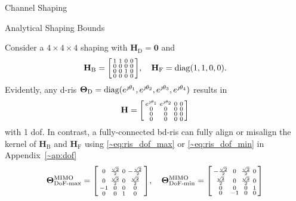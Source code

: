 \documentclass[journal]{IEEEtran}
\begin{document}
\begin{section}{Channel Shaping}
\begin{subsection}{Analytical Shaping Bounds}
		\begin{example}
			\label{eg:dof}
			Consider a $4 \times 4 \times 4$ shaping with $\mathbf{H}_\mathrm{D} = \mathbf{0}$ and
			\begin{equation*}
				\mathbf{H}_\mathrm{B} =
				\begin{bsmallmatrix}
					1 & 1 & 0 & 0 \\
					0 & 0 & 0 & 0 \\
					0 & 0 & 1 & 0 \\
					0 & 0 & 0 & 0
				\end{bsmallmatrix}, \quad
				\mathbf{H}_\mathrm{F} =
				\operatorname{diag}(1, 1, 0, 0).
			\end{equation*}
			Evidently, any \gls{d}-\gls{ris} $\mathbf{\Theta}_\mathrm{D} = \operatorname{diag}(e^{\jmath \theta_1}, e^{\jmath \theta_2}, e^{\jmath \theta_3}, e^{\jmath \theta_4})$ results in
			\begin{equation*}
				\mathbf{H} =
				\begin{bsmallmatrix}
					e^{\jmath \theta_1} & e^{\jmath \theta_2} & 0 & 0 \\
					0 & 0 & 0 & 0 \\
					0 & 0 & 0 & 0 \\
					0 & 0 & 0 & 0
				\end{bsmallmatrix}
			\end{equation*}
			with 1 \gls{dof}.
			In contrast, a fully-connected \gls{bd}-\gls{ris} can fully align or misalign the kernel of $\mathbf{H}_\mathrm{B}$ and $\mathbf{H}_\mathrm{F}$ using \eqref{~eq:ris_dof_max} or \eqref{~eq:ris_dof_min} in Appendix~\ref{~ap:dof}
			\begin{equation*}
				\mathbf{\Theta}_{\textnormal{DoF-max}}^{\textnormal{MIMO}} =
				\begin{bsmallmatrix}
					0 & \frac{\sqrt{2}}{2} & 0 & -\frac{\sqrt{2}}{2} \\
					0 & \frac{\sqrt{2}}{2} & 0 & \frac{\sqrt{2}}{2} \\
					-1 & 0 & 0 & 0 \\
					0 & 0 & 1 & 0
				\end{bsmallmatrix}, \quad
				\mathbf{\Theta}_{\textnormal{DoF-min}}^{\textnormal{MIMO}} =
				\begin{bsmallmatrix}
					-\frac{\sqrt{2}}{2} & 0 & \frac{\sqrt{2}}{2} & 0\\
					\frac{\sqrt{2}}{2} & 0 & \frac{\sqrt{2}}{2} & 0 \\
					0 & 0 & 0 & 1 \\
					0 & -1 & 0 & 0

\end{bsmallmatrix}
\end{equation*}
\end{example}
\end{subsection}
\end{section}
\end{document}
